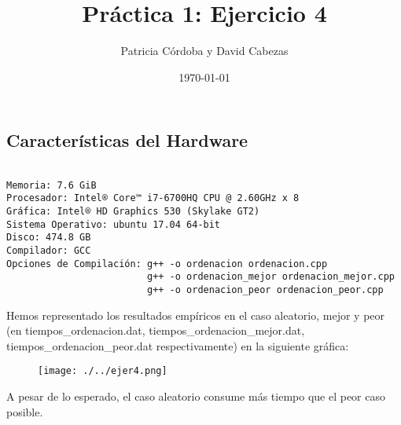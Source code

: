 \documentclass{article}
\begin{document}
\title{Práctica 1: Ejercicio 4}
\author{Patricia Córdoba y David Cabezas}
\date{\today}
\maketitle

\subsection*{Características del Hardware}
\begin{verbatim}

Memoria: 7.6 GiB
Procesador: Intel® Core™ i7-6700HQ CPU @ 2.60GHz x 8
Gráfica: Intel® HD Graphics 530 (Skylake GT2)
Sistema Operativo: ubuntu 17.04 64-bit
Disco: 474.8 GB
Compilador: GCC
Opciones de Compilación: g++ -o ordenacion ordenacion.cpp
                         g++ -o ordenacion_mejor ordenacion_mejor.cpp
                         g++ -o ordenacion_peor ordenacion_peor.cpp

\end{verbatim}

\begin{justify}
  Hemos representado los resultados empíricos en el caso aleatorio, mejor y peor (en
  tiempos\_ordenacion.dat, tiempos\_ordenacion\_mejor.dat,
  tiempos\_ordenacion\_peor.dat respectivamente) en la siguiente gráfica:
\end{justify}

\begin{figure}[H]
  \centering
  \texttt{[image: ./../ejer4.png]}
\end{figure}

\begin{justify}
  A pesar de lo esperado, el caso aleatorio consume más tiempo que el peor caso posible.  
\end{justify}
\end{document}
